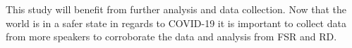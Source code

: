 \documentclass[12pt, letterpaper]{article}
\begin{document}
This study will benefit from further analysis and data collection. Now that the world is in a safer state in regards to COVID-19 it is important to collect data from more speakers to corroborate the data and analysis from FSR and RD. 




\printbibliography[heading=bibintoc]
\end{document}
